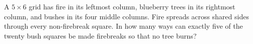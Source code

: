 A $5\times6$ grid has fire in its leftmost column, blueberry trees in its rightmost column, and bushes in its four middle columns. Fire spreads across shared sides through every non-firebreak square. In how many ways can exactly five of the twenty bush squares be made firebreaks so that no tree burns?
